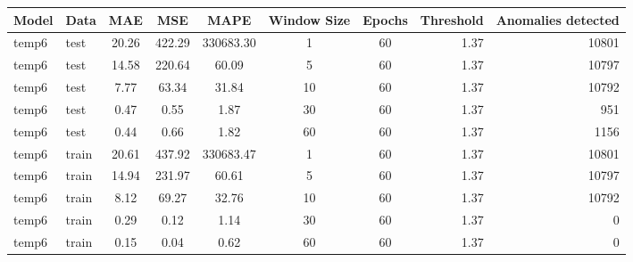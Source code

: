 \begin{tabular}{llcccccrr}
\hline
Model & Data & MAE & MSE & MAPE & Window Size & Epochs & Threshold & Anomalies detected \\
\hline
temp6 & test & 20.26 & 422.29 & 330683.30 & 1 & 60 & 1.37 & 10801 \\
temp6 & test & 14.58 & 220.64 & 60.09 & 5 & 60 & 1.37 & 10797 \\
temp6 & test & 7.77 & 63.34 & 31.84 & 10 & 60 & 1.37 & 10792 \\
temp6 & test & 0.47 & 0.55 & 1.87 & 30 & 60 & 1.37 & 951 \\
temp6 & test & 0.44 & 0.66 & 1.82 & 60 & 60 & 1.37 & 1156 \\
temp6 & train & 20.61 & 437.92 & 330683.47 & 1 & 60 & 1.37 & 10801 \\
temp6 & train & 14.94 & 231.97 & 60.61 & 5 & 60 & 1.37 & 10797 \\
temp6 & train & 8.12 & 69.27 & 32.76 & 10 & 60 & 1.37 & 10792 \\
temp6 & train & 0.29 & 0.12 & 1.14 & 30 & 60 & 1.37 & 0 \\
temp6 & train & 0.15 & 0.04 & 0.62 & 60 & 60 & 1.37 & 0 \\
\hline
\end{tabular}
